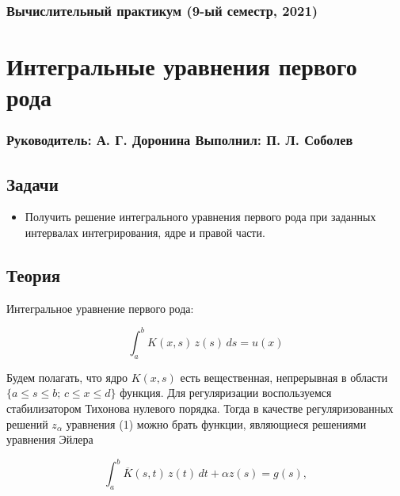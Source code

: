 




\subsubsection*{Вычислительный практикум (9-ый семестр, 2021)}
\section*{Интегральные уравнения первого рода}
\subsubsection*{Руководитель: А. Г. Доронина \hspace{2em} Выполнил: П. Л. Соболев}

\vspace{3em}

\subsection*{Задачи}

\begin{itemize}
  \setlength\itemsep{-0.1em}
  \item Получить решение интегрального уравнения первого рода при заданных интервалах интегрирования, ядре и правой части.
\end{itemize}

\subsection*{Теория}

Интегральное уравнение первого рода:

\begin{equation}
  \int_a^b K(x, s) \, z(s) \, ds = u(x)
\end{equation}

Будем полагать, что ядро $ K(x, s) $ есть вещественная, непрерывная в области $ \{ a \leqslant s \leqslant b; \, c \leqslant x \leqslant d \} $ функция. Для регуляризации воспользуемся стабилизатором Тихонова нулевого порядка. Тогда в качестве регуляризованных решений $ z_{\alpha} $ уравнения (1) можно брать функции, являющиеся решениями уравнения Эйлера

\begin{equation}
  \int_a^b \overline{K}(s, t) \, z(t) \, dt + \alpha z(s) = g(s),
\end{equation}


